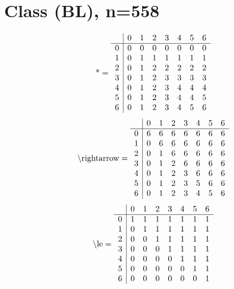 \documentclass[11pt]{article}
\begin{document}
\section{Class (BL), n=558}
\[\text{*} = 
\begin{array}{r | r r r r r r r}
 & 0 & 1 & 2 & 3 & 4 & 5 & 6 \\ \hline
0 & 0 & 0 & 0 & 0 & 0 & 0 & 0 \\
1 & 0 & 1 & 1 & 1 & 1 & 1 & 1 \\
2 & 0 & 1 & 2 & 2 & 2 & 2 & 2 \\
3 & 0 & 1 & 2 & 3 & 3 & 3 & 3 \\
4 & 0 & 1 & 2 & 3 & 4 & 4 & 4 \\
5 & 0 & 1 & 2 & 3 & 4 & 4 & 5 \\
6 & 0 & 1 & 2 & 3 & 4 & 5 & 6 \\
\end{array}
\]
\[\text{\textbackslash rightarrow} = 
\begin{array}{r | r r r r r r r}
 & 0 & 1 & 2 & 3 & 4 & 5 & 6 \\ \hline
0 & 6 & 6 & 6 & 6 & 6 & 6 & 6 \\
1 & 0 & 6 & 6 & 6 & 6 & 6 & 6 \\
2 & 0 & 1 & 6 & 6 & 6 & 6 & 6 \\
3 & 0 & 1 & 2 & 6 & 6 & 6 & 6 \\
4 & 0 & 1 & 2 & 3 & 6 & 6 & 6 \\
5 & 0 & 1 & 2 & 3 & 5 & 6 & 6 \\
6 & 0 & 1 & 2 & 3 & 4 & 5 & 6 \\
\end{array}
\]
\[\text{\textbackslash le} = 
\begin{array}{r | r r r r r r r}
 & 0 & 1 & 2 & 3 & 4 & 5 & 6 \\ \hline
0 & 1 & 1 & 1 & 1 & 1 & 1 & 1 \\
1 & 0 & 1 & 1 & 1 & 1 & 1 & 1 \\
2 & 0 & 0 & 1 & 1 & 1 & 1 & 1 \\
3 & 0 & 0 & 0 & 1 & 1 & 1 & 1 \\
4 & 0 & 0 & 0 & 0 & 1 & 1 & 1 \\
5 & 0 & 0 & 0 & 0 & 0 & 1 & 1 \\
6 & 0 & 0 & 0 & 0 & 0 & 0 & 1 \\
\end{array}
\]
\end{document}
